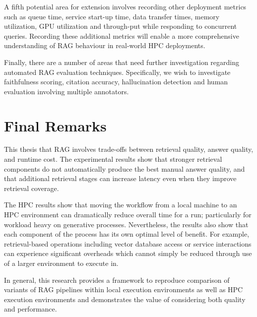 A fifth potential area for extension involves recording other deployment metrics such as queue time, service start-up time, data transfer times, memory utilization, GPU utilization and through-put while responding to concurrent queries. Recording these additional metrics will enable a more comprehensive understanding of \ac{RAG} behaviour in real-world \ac{HPC} deployments.

Finally, there are a number of areas that need further investigation regarding automated \ac{RAG} evaluation techniques. Specifically, we wish to investigate faithfulness scoring, citation accuracy, hallucination detection and human evaluation involving multiple annotators.

\section{Final Remarks}

This thesis that \acf{RAG} involves trade-offs between retrieval quality, answer quality, and runtime cost. The experimental results show that stronger retrieval components do not automatically produce the best manual answer quality, and that additional retrieval stages can increase latency even when they improve retrieval coverage.

The \ac{HPC} results show that moving the workflow from a local machine to an \ac{HPC} environment can dramatically reduce overall time for a run; particularly for workload heavy on generative processes. Nevertheless, the results also show that each component of the process has its own optimal level of benefit. For example, retrieval-based operations including vector database access or service interactions can experience significant overheads which cannot simply be reduced through use of a larger environment to execute in.

In general, this research provides a framework to reproduce comparison of variants of \ac{RAG} pipelines within local execution environments as well as \ac{HPC} execution environments and demonstrates the value of considering both quality and performance.